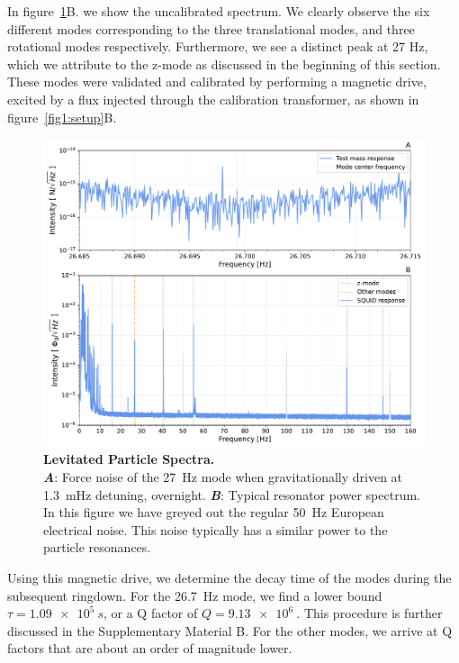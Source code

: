 \documentclass[pdflatex,sn-mathphys,12pt]{sn-jnl}
\begin{document}
%


    In figure~\ref{fig2:spectrum}B. we show the uncalibrated spectrum.
    We clearly observe the six different modes corresponding to the three translational modes, and three rotational modes respectively. 
    Furthermore, we see a distinct peak at 27 Hz, which we attribute to the z-mode as discussed in the beginning of this section.
    These modes were validated and calibrated by performing a magnetic drive, excited by a flux injected through the calibration transformer, as shown in figure~\ref{fig1:setup}B. 
    
    \begin{figure}[ht]%
        \centering
        \includegraphics[width=\textwidth]{Results/paper_spectrum_combined.pdf}%
        \caption{\textbf{Levitated Particle Spectra.}\\
        \textbf{\emph{A}}: Force noise of the \SI{27}{Hz} mode when gravitationally driven at \SI{1.3}{mHz} detuning, overnight. \textbf{\emph{B}}: Typical resonator power spectrum. In this figure we have greyed out the regular \SI{50}{Hz} European electrical noise. This noise typically has a similar power to the particle resonances.}\label{fig2:spectrum}
    \end{figure}
    
    Using this magnetic drive, we determine the decay time of the modes during the subsequent ringdown. For the \SI{26.7}{Hz} mode, we find a lower bound  $\tau = \SI{1.09e5}{s}$, or a Q factor of $Q = \SI{9.13e6}{}$. This procedure is further discussed in the Supplementary Material B. For the other modes, we arrive at Q factors that are about an order of magnitude lower.
    
\end{document}

